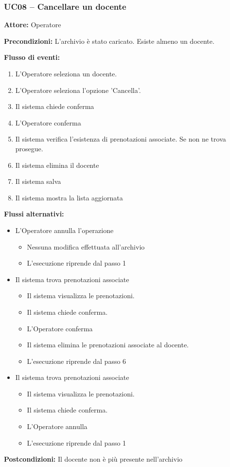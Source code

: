 \documentclass[a4paper,11pt]{article}
\begin{document}
\begin{samepage}
\subsubsection*{UC08 -- Cancellare un docente}
\begin{ucbox}

\noindent\textbf{Attore:} Operatore\par
\noindent\textbf{Precondizioni:} L'archivio è stato caricato. Esiste almeno un docente.\par

\noindent\textbf{Flusso di eventi:}
\begin{enumerate}
\item L'Operatore seleziona un docente. \item L'Operatore seleziona l'opzione 'Cancella'. \item Il sistema chiede conferma \item L'Operatore conferma \item Il sistema verifica l'esistenza di prenotazioni associate. Se non ne trova prosegue. \item Il sistema elimina il docente \item Il sistema salva \item Il sistema mostra la lista aggiornata \end{enumerate}
\noindent\textbf{Flussi alternativi:}
\begin{itemize}
\item[4a.] L'Operatore annulla l'operazione
\begin{itemize}
\item Nessuna modifica effettuata all'archivio
\item L'esecuzione riprende dal passo 1
\end{itemize}
\item[5a.] Il sistema trova prenotazioni associate
\begin{itemize}
\item Il sistema visualizza le prenotazioni.
\item Il sistema chiede conferma.
\item L'Operatore conferma
\item Il sistema elimina le prenotazioni associate al docente.
\item L'esecuzione riprende dal passo 6
\end{itemize}
\item[5b.] Il sistema trova prenotazioni associate
\begin{itemize}
\item Il sistema visualizza le prenotazioni.
\item Il sistema chiede conferma.
\item L'Operatore annulla
\item L'esecuzione riprende dal passo 1
\end{itemize}
\end{itemize}
\noindent\textbf{Postcondizioni:} Il docente non è più presente nell'archivio\par
\end{ucbox}
\end{samepage}
\end{document}
